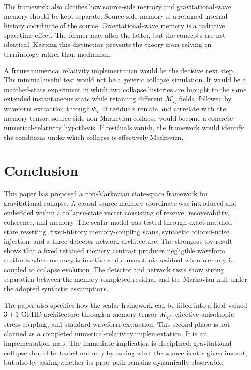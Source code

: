 \documentclass[11pt]{article}
\begin{document}
The framework also clarifies how source-side memory and gravitational-wave memory should be kept separate. Source-side memory is a retained internal history coordinate of the source. Gravitational-wave memory is a radiative spacetime effect. The former may alter the latter, but the concepts are not identical. Keeping this distinction prevents the theory from relying on terminology rather than mechanism.

A future numerical relativity implementation would be the decisive next step. The minimal useful test would not be a generic collapse simulation. It would be a matched-state experiment in which two collapse histories are brought to the same extended instantaneous state while retaining different \(\mathcal{M}_{ij}\) fields, followed by waveform extraction through \(\Psi_4\). If residuals remain and correlate with the memory tensor, source-side non-Markovian collapse would become a concrete numerical-relativity hypothesis. If residuals vanish, the framework would identify the conditions under which collapse is effectively Markovian.

\section{Conclusion}

This paper has proposed a non-Markovian state-space framework for gravitational collapse. A causal source-memory coordinate was introduced and embedded within a collapse-state vector consisting of reserve, recoverability, coherence, and memory. The scalar model was tested through exact matched-state resetting, fixed-history memory-coupling scans, synthetic colored-noise injection, and a three-detector network architecture. The strongest toy result shows that a fixed retained memory contrast produces negligible waveform residuals when memory is inactive and a monotonic residual when memory is coupled to collapse evolution. The detector and network tests show strong separation between the memory-completed residual and the Markovian null under the adopted synthetic assumptions.

The paper also specifies how the scalar framework can be lifted into a field-valued \(3+1\) GRHD architecture through a memory tensor \(\mathcal{M}_{ij}\), effective anisotropic stress coupling, and standard waveform extraction. This second phase is not claimed as a completed numerical-relativity implementation. It is an implementation map. The immediate implication is disciplined: gravitational collapse should be tested not only by asking what the source is at a given instant, but also by asking whether its prior path remains dynamically observable.
\end{document}

